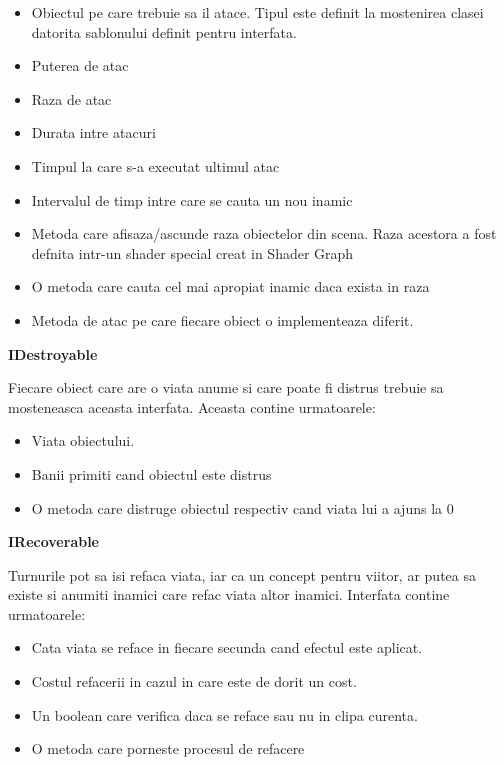 \documentclass[12pt, a4paper]{article}
\begin{document}
	 \begin{itemize}
	 	\item Obiectul pe care trebuie sa il atace. Tipul este definit la mostenirea clasei datorita sablonului definit pentru interfata.
	 	\item Puterea de atac
	 	\item Raza de atac
	 	\item Durata intre atacuri
	 	\item Timpul la care s-a executat ultimul atac
	 	\item Intervalul de timp intre care se cauta un nou inamic
	 	\item Metoda care afisaza/ascunde raza obiectelor din scena. Raza acestora a fost defnita intr-un shader special creat in Shader Graph
	 	\item O metoda care cauta cel mai apropiat inamic daca exista in raza
	 	\item Metoda de atac pe care fiecare obiect o implementeaza diferit.
	\end{itemize}
 	\bigskip
 	
 	\textbf{IDestroyable}
 	
 	Fiecare obiect care are o viata anume si care poate fi distrus trebuie sa mosteneasca aceasta interfata. Aceasta contine urmatoarele:
 	
 	\begin{itemize}
 		\item Viata obiectului.
 		\item Banii primiti cand obiectul este distrus
 		\item O metoda care distruge obiectul respectiv cand viata lui a ajuns la 0
 	\end{itemize}
 	\bigskip
 	
 	\textbf{IRecoverable}
 	
 	Turnurile pot sa isi refaca viata, iar ca un concept pentru viitor, ar putea sa existe si anumiti inamici care refac viata altor inamici. Interfata contine urmatoarele:
 	
 	\begin{itemize}
 		\item Cata viata se reface in fiecare secunda cand efectul este aplicat.
 		\item Costul refacerii in cazul in care este de dorit un cost.
 		\item Un boolean care verifica daca se reface sau nu in clipa curenta.
 		\item O metoda care porneste procesul de refacere
 	\end{itemize}
	
\end{document}
